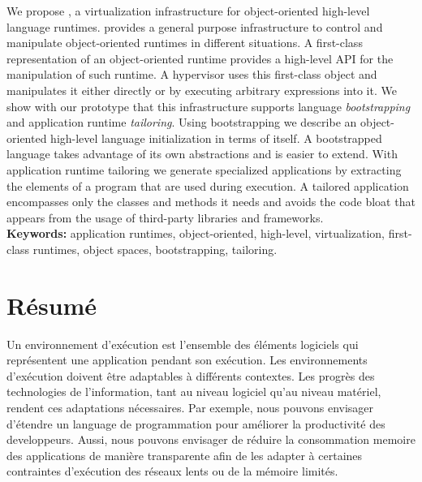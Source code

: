 \documentclass[a4paper,11pt,twoside]{include/ThesisStyle}
\begin{document}
We propose \Vtt, a virtualization infrastructure for object-oriented high-level language runtimes. \Vtt provides a general purpose infrastructure to control and manipulate object-oriented runtimes in different situations. A first-class representation of an object-oriented runtime provides a high-level API for the manipulation of such runtime. A hypervisor uses this first-class object and manipulates it either directly or by executing arbitrary expressions into it.
We show with our prototype that this infrastructure supports language \emph{bootstrapping} and application runtime \emph{tailoring}. Using bootstrapping we describe an object-oriented high-level language initialization in terms of itself. A bootstrapped language takes advantage of its own abstractions and is easier to extend. With application runtime tailoring we generate specialized applications by extracting the elements of a program that are used during execution. A tailored application encompasses only the classes and methods it needs and avoids the code bloat that appears from the usage of third-party libraries and frameworks. \\

\textbf{Keywords:} application runtimes, object-oriented, high-level, virtualization, first-class runtimes, object spaces, bootstrapping, tailoring.

\chapter*{Résumé}

Un environnement d'exécution est l'ensemble des éléments logiciels qui représentent une application pendant son exécution. Les environnements d'exécution doivent être adaptables à différents contextes. Les progrès des technologies de l'information, tant au niveau logiciel qu'au niveau matériel, rendent ces adaptations nécessaires. Par exemple, nous pouvons envisager d'étendre un language de programmation pour améliorer la productivité des developpeurs. Aussi, nous pouvons envisager de réduire la consommation memoire des applications de manière transparente afin de les adapter à certaines contraintes d'exécution \eg des réseaux lents ou de la mémoire limités.
\end{document}

